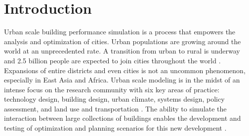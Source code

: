 \documentclass{tBPS2e}
\theoremstyle{plain}
\theoremstyle{definition}
\theoremstyle{remark}
\begin{document}

\linenumbers

\section{Introduction}
Urban scale building performance simulation is a process that empowers the
analysis and optimization of cities. Urban populations are growing around the
world at an unprecedented rate. A transition from urban to rural is underway and
2.5 billion people are expected to join cities throughout the world
\citep{UnitedNations:2014vn}. Expansions of entire districts and even cities
is not an uncommon phenomenon, especially in East Asia and Africa. Urban scale
modeling is in the midst of an intense focus on the research community with
six key areas of practice: technology design, building design, urban climate,
systems design, policy assessment, and land use and transportation
\citep{Keirstead:2012ct}. The ability to simulate the interaction between
large collections of buildings enables the development and testing of
optimization and planning scenarios for this new development
\citep{Dorer:2013vt}.
\end{document}
